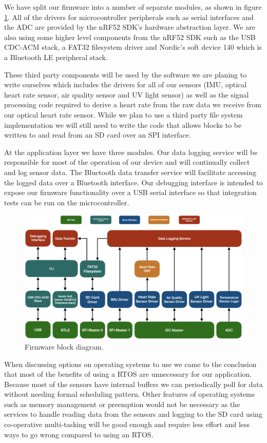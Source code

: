 We have split our firmware into a number of separate modules, as shown in figure
\ref{fig:fw_block_diag}. All of the drivers for microcontroller peripherals
such as serial interfaces and the ADC are provided by the nRF52 SDK's hardware
abstraction layer. We are also using some higher level components from the
nRF52 SDK such as the USB CDC-ACM stack, a FAT32 filesystem driver and Nordic's
soft device 140 which is a Bluetooth LE peripheral stack.

These third party components will be used by the software we are planing to
write ourselves which includes the drivers for all of our sensors (IMU, optical
heart rate sensor, air quality sensor and UV light sensor) as well as the signal
processing code required to derive a heart rate from the raw data we receive
from our optical heart rate sensor. While we plan to use a third party file
system implementation we will still need to write the code that allows blocks
to be written to and read from an SD card over an SPI interface.

At the application layer we have three modules. Our data logging service will be
responsible for most of the operation of our device and will continually collect
and log sensor data. The Bluetooth data transfer service will facilitate
accessing the logged data over a Bluetooth interface. Our debugging interface is
intended to expose our firmware functionality over a USB serial interface so
that integration tests can be run on the microcontroller.

\begin{figure}[!htb]
\centering
\includegraphics[width=\textwidth]{images/fw_block_diag.png}
\caption{Firmware block diagram.}
\label{fig:fw_block_diag}
\end{figure}

When discussing options on operating systems to use we came to the conclusion 
that most of the benefits of using a RTOS are unnecessary for our application.
Because most of the sensors have internal buffers we can periodically poll
for data without needing formal scheduling pattern.  Other features of 
operating systems such as memory management or preemption would not be
necessary as the services to handle reading data from the sensors and logging
to the SD card using co-operative multi-tasking will be good enough and require
less effort and less ways to go wrong compared to using an RTOS.

